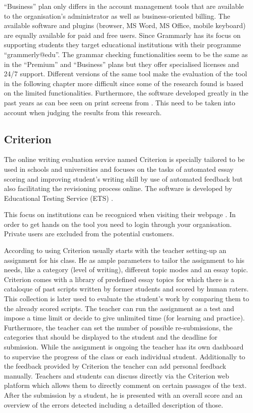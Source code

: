 \documentclass[runningheads]{llncs}
\let\OldTextregistered\textregistered
\renewcommand{\textregistered}{\OldTextregistered\xspace}%
\begin{document}
``Business'' plan only differs in the account management tools that are available to the organisation's administrator as well as business-oriented billing. The available software and plugins (browser, MS Word, MS Office, mobile keyboard) are equally available for paid and free users. Since Grammarly\textregistered has its focus on supporting students they target educational institutions with their programme ``grammerly@edu''. The grammar checking functionalities seem to be the same as in the ``Premium'' and ``Business'' plans but they offer specialised licenses and 24/7 support. Different versions of the same tool make the evaluation of the tool in the following chapter more difficult since some of the research found is based on the limited functionalities. Furthermore, the software developed greatly in the past years as can bee seen on print screens from \textcite{dembsey_closing_2017}. This need to be taken into account when judging the results from this research.


\subsection{Criterion\textregistered}
The online writing evaluation service named Criterion\textregistered is specially tailored to be used in schools and universities and focuses on the tasks of automated essay scoring and improving student's writing skill by use of automated feedback but also facilitating the revisioning process online. The software is developed by Educational Testing Service (ETS) \citep{noauthor_ets_nodate}.

This focus on institutions can be recogniced when visiting their webpage \citep{noauthor_ets_nodate}. In order to get hands on the tool you need to login through your organisation. Private users are excluded from the potential customers. 

According to \textcite{lim_review_2012} using Criterion\textregistered usually starts with the teacher setting-up an assignment for his class. He as ample parameters to tailor the assignment to his needs, like a category (level of writing), different topic modes and an essay topic. Criterion\textregistered comes with a library of predefined essay topics for which there is a cataloque of past scripts written by former students and scored by human raters. This collection is later used to evaluate the student's work by comparing them to the already scored scripts. The teacher can run the assignment as a test and impose a time limit or decide to give unlimited time (for learning and practice). Furthermore, the teacher can set the number of possible re-submissions, the categories that should be displayed to the student and the deadline for submission. While the assignment is ongoing the teacher has its own dashboard to supervise the progress of the class or each individual student. Additionally to the feedback provided by Criterion\textregistered the teacher can add personal feedback manually. Teachers and students can discuss directly via the Criterion\textregistered web platform which allows them to directly comment on certain passages of the text. After the submission by a student, he is presented with an overall score and an overview of the errors detected including a detailled description of those.
\end{document}
